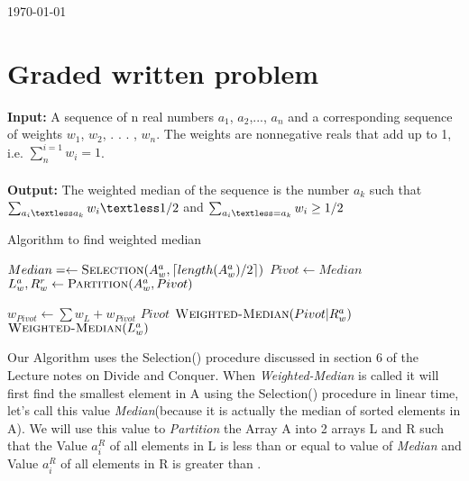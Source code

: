 \documentclass[8pt]{article}
\DeclarePairedDelimiter\ceil{\lceil}{\rceil}
\begin{document}
\hfill \small{\today} \\
\setlength{\fboxrule}{.5mm}\setlength{\fboxsep}{1.2mm}
\newlength{\boxlength}\setlength{\boxlength}{\textwidth}
\addtolength{\boxlength}{-4mm}
\begin{center}\end{center}
\vspace{5mm}

\section{Graded written problem}

\textbf{Input:} A sequence of n real numbers $a_1$, $a_2$,..., $a_n$ and a corresponding sequence of weights $w_1$, $w_2$, . . . , $w_n$. The weights are nonnegative reals that add up to 1, i.e. $\sum_n^{i=1} w_i = 1$. \\
\\
\textbf{Output:} The weighted median of the sequence is the number $a_k$ such that
$\sum_{a_i \textless a_k} w_i \textless 1/2$ and $\sum_{a_i \textless= a_k} w_i \geq 1/2$

\begin{algorithm}
\caption{Algorithm to find weighted median}\label{euclid}
\begin{algorithmic}[1]

    \State {} 
\EndIf

\State $Median = \leftarrow \Call{Selection}{A_w^a, \ceil{length(A_w^a)/2}}$ 
    \State $Pivot \leftarrow Median$
    \State $L_{w}^{a},R_{w}^{r} \leftarrow \Call{Partition}{A_w^a, Pivot}$

        \State $w_{Pivot} \leftarrow \sum w_L + w_{Pivot}$
            \State \Return ${Pivot}$
        \EndIf
        \State $\Call{Weighted-Median}{Pivot|R_w^a}$
    \Else
        \State $\Call{Weighted-Median}{L_w^a}$
    \EndIf

\EndProcedure
\end{algorithmic}
\end{algorithm}

Our Algorithm uses the Selection() procedure discussed in section 6 of the Lecture 
notes on Divide and Conquer. When \textit{Weighted-Median} is called it will first
find the  smallest element in A using the Selection() procedure in linear
time, let's call this value \textit{Median}(because it is actually the median of
sorted elements in A). We will use this value to \textit{Partition} the Array A into
2 arrays L and R such that the Value $a_i^R$ of all elements in L is less than or equal
to value of \textit{Median} and Value $a_i^R$ of all elements in R is greater than .
\end{document}
